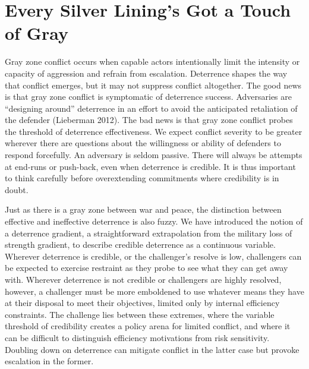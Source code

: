 \documentclass[
]{article}
\begin{document}
\hypertarget{every-silver-linings-got-a-touch-of-gray}{%
\section{Every Silver Lining's Got a Touch of Gray}\label{every-silver-linings-got-a-touch-of-gray}}

Gray zone conflict occurs when capable actors intentionally limit the intensity or capacity of aggression and refrain from escalation. Deterrence shapes the way that conflict emerges, but it may not suppress conflict altogether. The good news is that gray zone conflict is symptomatic of deterrence success. Adversaries are ``designing around'' deterrence in an effort to avoid the anticipated retaliation of the defender (Lieberman 2012). The bad news is that gray zone conflict probes the threshold of deterrence effectiveness. We expect conflict severity to be greater wherever there are questions about the willingness or ability of defenders to respond forcefully. An adversary is seldom passive. There will always be attempts at end-runs or push-back, even when deterrence is credible. It is thus important to think carefully before overextending commitments where credibility is in doubt.

Just as there is a gray zone between war and peace, the distinction between effective and ineffective deterrence is also fuzzy. We have introduced the notion of a deterrence gradient, a straightforward extrapolation from the military loss of strength gradient, to describe credible deterrence as a continuous variable. Wherever deterrence is credible, or the challenger's resolve is low, challengers can be expected to exercise restraint as they probe to see what they can get away with. Wherever deterrence is not credible or challengers are highly resolved, however, a challenger must be more emboldened to use whatever means they have at their disposal to meet their objectives, limited only by internal efficiency constraints. The challenge lies between these extremes, where the variable threshold of credibility creates a policy arena for limited conflict, and where it can be difficult to distinguish efficiency motivations from risk sensitivity. Doubling down on deterrence can mitigate conflict in the latter case but provoke escalation in the former.
\end{document}
